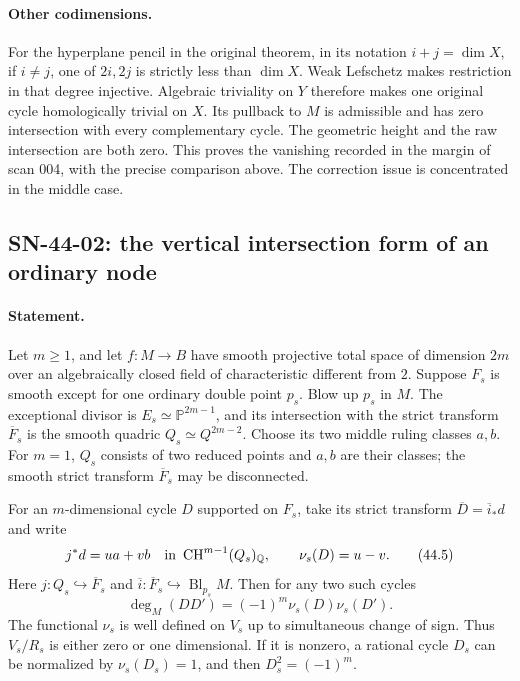 \paragraph{Other codimensions.}
For the hyperplane pencil in the original theorem, in its notation
$i+j=\dim X$, if $i\ne j$, one of $2i,2j$
is strictly less than $\dim X$.  Weak Lefschetz makes restriction in
that degree injective.  Algebraic triviality on $Y$ therefore makes
one original cycle homologically trivial on $X$.  Its pullback to
$M$ is admissible and has zero intersection with every complementary
cycle.  The geometric height and the raw intersection are both zero.
This proves the vanishing recorded in the margin of scan 004, with
the precise comparison above.  The correction issue is concentrated
in the middle case.

\subsection{SN-44-02: the vertical intersection form of an ordinary node}
\label{sn:44-02}

\paragraph{Statement.}
Let $m\ge1$, and let $f:M\to B$ have smooth projective total space of dimension
$2m$ over an algebraically closed field of characteristic different
from $2$.  Suppose $F_s$ is smooth except for one ordinary double
point $p_s$.  Blow up $p_s$ in $M$.  The exceptional divisor is
$E_s\simeq\mathbb P^{2m-1}$, and its intersection with the strict
transform $\overline F_s$ is the smooth quadric
$Q_s\simeq Q^{2m-2}$.  Choose its two middle ruling classes $a,b$.
For $m=1$, $Q_s$ consists of two reduced points and $a,b$ are their
classes; the smooth strict transform $\overline F_s$ may be disconnected.

For an $m$-dimensional cycle $D$ supported on $F_s$, take its strict
transform $\overline D=\overline i_*d$ and write
\[
 j^*d=u a+v b\quad\hbox{in }\operatorname{CH}^{m-1}(Q_s)_{\mathbb Q},
 \qquad \nu_s(D)=u-v.                                      \tag{44.5}
\]
Here $j:Q_s\hookrightarrow\overline F_s$ and
$\overline i:\overline F_s\hookrightarrow\operatorname{Bl}_{p_s}M$.
Then for any two such cycles
\[
 \boxed{\quad\deg_M(DD')=(-1)^m\nu_s(D)\nu_s(D').\quad}       \tag{44.6}
 \label{eq:44-node-form}
\]
The functional $\nu_s$ is well defined on $V_s$ up to simultaneous
change of sign.  Thus $V_s/R_s$ is either zero or one dimensional.
If it is nonzero, a rational cycle $D_s$ can be normalized by
$\nu_s(D_s)=1$, and then $D_s^2=(-1)^m$.

